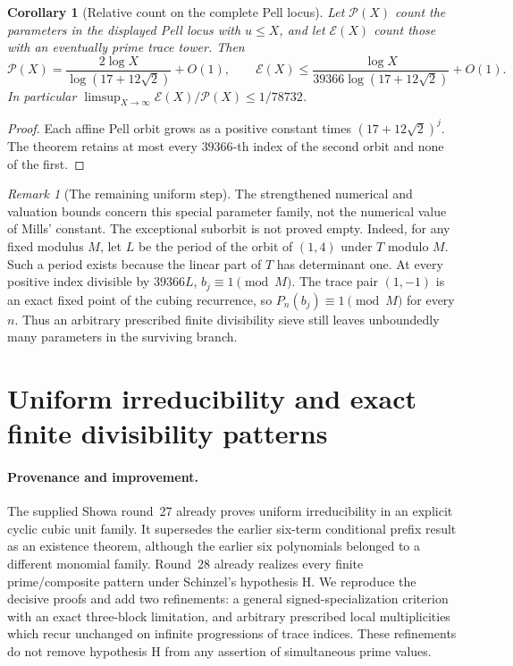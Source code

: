 \documentclass[11pt,a4paper]{article}
\newtheorem{corollary}[theorem]{Corollary}
\theoremstyle{remark}\newtheorem{remark}[theorem]{Remark}
\begin{document}
\begin{corollary}[Relative count on the complete Pell locus]
Let $\mathcal P(X)$ count the parameters in the displayed Pell locus
with $u\le X$, and let $\mathcal E(X)$ count those with an eventually
prime trace tower. Then
\[
 \mathcal P(X)=\frac{2\log X}{\log(17+12\sqrt2)}+O(1),\qquad
 \mathcal E(X)\le
 \frac{\log X}{39366\log(17+12\sqrt2)}+O(1).
\]
In particular $\limsup_{X\to\infty}\mathcal E(X)/\mathcal P(X)
\le1/78732$.
\end{corollary}
\begin{proof}
Each affine Pell orbit grows as a positive constant times
$(17+12\sqrt2)^j$. The theorem retains at most every $39366$-th
index of the second orbit and none of the first.
\end{proof}

\begin{remark}[The remaining uniform step]
The strengthened numerical and valuation bounds concern this special
parameter family, not the numerical value of Mills' constant.
The exceptional suborbit is not proved empty. Indeed, for any fixed
modulus $M$, let $L$ be the period of the orbit of $(1,4)$ under $T$
modulo $M$. Such a period exists because the linear part of $T$ has
determinant one. At every positive index divisible by $39366L$,
$b_j\equiv1\pmod M$. The trace pair $(1,-1)$ is an exact fixed point
of the cubing recurrence, so $P_n(b_j)\equiv1\pmod M$ for every $n$.
Thus an arbitrary prescribed finite divisibility sieve still leaves
unboundedly many parameters in the surviving branch.
\end{remark}

\section{Uniform irreducibility and exact finite divisibility patterns}
\label{sec:factor-patterns}

\paragraph{Provenance and improvement.}
The supplied Showa round~27 already proves uniform irreducibility in
an explicit cyclic cubic unit family. It supersedes the earlier
six-term conditional prefix result as an existence theorem, although
the earlier six polynomials belonged to a different monomial family.
Round~28 already realizes every finite prime/composite pattern under
Schinzel's hypothesis H. We reproduce the decisive proofs and add two
refinements: a general signed-specialization criterion with an exact
three-block limitation, and arbitrary prescribed local multiplicities
which recur unchanged on infinite progressions of trace indices.
These refinements do not remove hypothesis H from any assertion of
simultaneous prime values.
\end{document}
